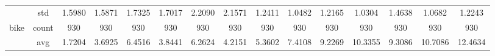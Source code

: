 \begin{table}[H]
{\begin{tabular}{rcccc|c|c|c|c|c|ccccc}
			                                                                               & std                                    & 1.5980                                                                             & 1.5871                                                                    & 1.7325                                                                    & 1.7017                                         & 2.2090                                                                    & 2.1571                                       & 1.2411                                      & 1.0482                                         & 1.2165                                         & 1.0304                                          & 1.4638                                          & 1.0682                                         & 1.2243                                         \\
			bike                                                                           & count                                  & 930                                                                                & 930                                                                       & 930                                                                       & 930                                            & 930                                                                       & 930                                          & 930                                         & 930                                            & 930                                            & 930                                             & 930                                             & 930                                            & 930                                            \\
			                                                                               & avg                                    & \cellcolor[rgb]{ .776,  .937,  .808}\textcolor[rgb]{ 0,  .38,  0}{1.7204}          & 3.6925                                                                    & 6.4516                                                                    & 3.8441                                         & 6.2624                                                                    & 4.2151                                       & 5.3602                                      & 7.4108                                         & 9.2269                                         & 10.3355                                         & 9.3086                                          & 10.7086                                        & 12.4634                                        \\

\end{tabular}}
\end{table}
